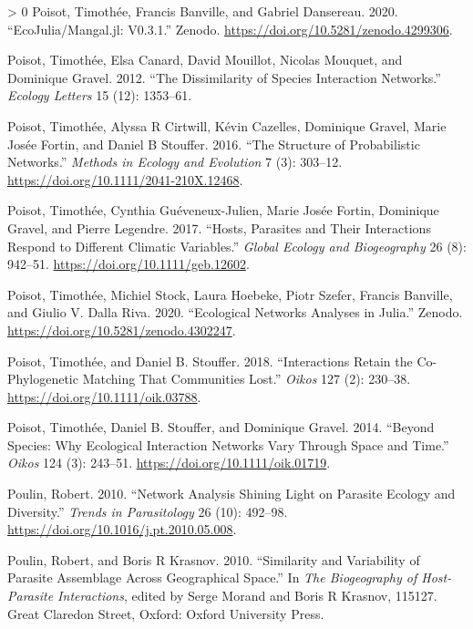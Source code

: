 \documentclass[12pt]{article}
\newlength{\cslhangindent}
\newenvironment{CSLReferences}[3] %
 {%
  \setlength{\parindent}{0pt}
  \ifodd #1 \everypar{\setlength{\hangindent}{\cslhangindent}}\ignorespaces\fi
  \ifnum #2 > 0
  \setlength{\parskip}{#2\baselineskip}
  \fi
 }%
 {}
\begin{document}
\begin{CSLReferences}{1}{0}
\leavevmode\hypertarget{ref-Poisot2020EcoMan}{}%
Poisot, Timothée, Francis Banville, and Gabriel Dansereau. 2020.
{``EcoJulia/Mangal.jl: V0.3.1.''} Zenodo.
\url{https://doi.org/10.5281/zenodo.4299306}.

\leavevmode\hypertarget{ref-Poisot2012DisSpe}{}%
Poisot, Timothée, Elsa Canard, David Mouillot, Nicolas Mouquet, and
Dominique Gravel. 2012. {``The Dissimilarity of Species Interaction
Networks.''} \emph{Ecology Letters} 15 (12): 1353--61.

\leavevmode\hypertarget{ref-Poisot2016StrPro}{}%
Poisot, Timothée, Alyssa R Cirtwill, Kévin Cazelles, Dominique Gravel,
Marie Josée Fortin, and Daniel B Stouffer. 2016. {``The Structure of
Probabilistic Networks.''} \emph{Methods in Ecology and Evolution} 7
(3): 303--12. \url{https://doi.org/10.1111/2041-210X.12468}.

\leavevmode\hypertarget{ref-Poisot2017HosPar}{}%
Poisot, Timothée, Cynthia Guéveneux-Julien, Marie Josée Fortin,
Dominique Gravel, and Pierre Legendre. 2017. {``Hosts, Parasites and
Their Interactions Respond to Different Climatic Variables.''}
\emph{Global Ecology and Biogeography} 26 (8): 942--51.
\url{https://doi.org/10.1111/geb.12602}.

\leavevmode\hypertarget{ref-Poisot2020EcoNet}{}%
Poisot, Timothée, Michiel Stock, Laura Hoebeke, Piotr Szefer, Francis
Banville, and Giulio V. Dalla Riva. 2020. {``Ecological Networks
Analyses in Julia.''} Zenodo.
\url{https://doi.org/10.5281/zenodo.4302247}.

\leavevmode\hypertarget{ref-Poisot2018IntRet}{}%
Poisot, Timothée, and Daniel B. Stouffer. 2018. {``Interactions Retain
the Co-Phylogenetic Matching That Communities Lost.''} \emph{Oikos} 127
(2): 230--38. \url{https://doi.org/10.1111/oik.03788}.

\leavevmode\hypertarget{ref-Poisot2014SpeWhy}{}%
Poisot, Timothée, Daniel B. Stouffer, and Dominique Gravel. 2014.
{``Beyond Species: Why Ecological Interaction Networks Vary Through
Space and Time.''} \emph{Oikos} 124 (3): 243--51.
\url{https://doi.org/10.1111/oik.01719}.

\leavevmode\hypertarget{ref-Poulin2010NetAna}{}%
Poulin, Robert. 2010. {``Network Analysis Shining Light on Parasite
Ecology and Diversity.''} \emph{Trends in Parasitology} 26 (10):
492--98. \url{https://doi.org/10.1016/j.pt.2010.05.008}.

\leavevmode\hypertarget{ref-Poulin2010SimVar}{}%
Poulin, Robert, and Boris R Krasnov. 2010. {``Similarity and Variability
of Parasite Assemblage Across Geographical Space.''} In \emph{The
Biogeography of Host-Parasite Interactions}, edited by Serge Morand and
Boris R Krasnov, 115127. Great Claredon Street, Oxford: Oxford
University Press.


\end{CSLReferences}
\end{document}
